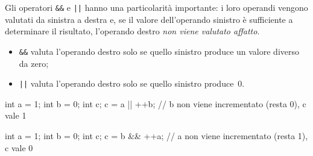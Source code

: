 \documentclass[11pt,a4paper]{article}
\begin{document}
Gli operatori \lstinline|&&| e \lstinline/||/ hanno una particolarità importante: i loro operandi vengono valutati da sinistra a destra e, se il valore dell'operando sinistro è sufficiente a determinare il risultato, l'operando destro \emph{non viene valutato affatto}.
\begin{itemize}
    \item \lstinline|&&| valuta l'operando destro solo se quello sinistro produce un valore diverso da zero;
    \item \lstinline/||/ valuta l'operando destro solo se quello sinistro produce~$0$.
\end{itemize}

\begin{esempio}
\begin{codice}
int a = 1;
int b = 0;
int c;
c = a || ++b;    // b non viene incrementato (resta 0), c vale 1
\end{codice}
\begin{codice}
int a = 1;
int b = 0;
int c;
c = b && ++a;    // a non viene incrementato (resta 1), c vale 0
\end{codice}
\end{esempio}
\end{document}
